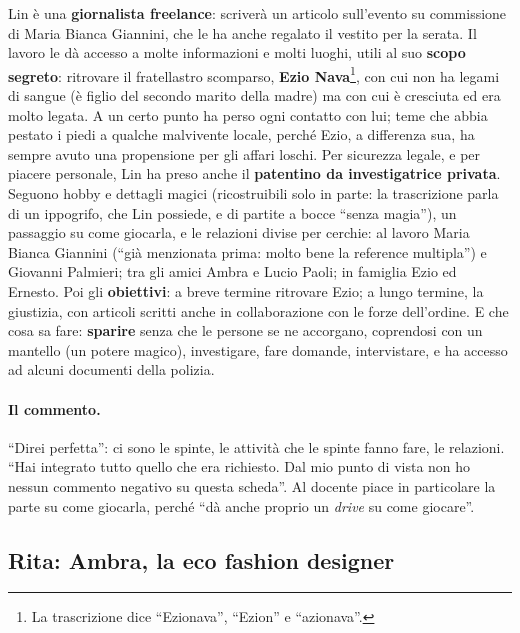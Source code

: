 Lin è una \textbf{giornalista freelance}: scriverà un articolo sull'evento su
commissione di Maria Bianca Giannini, che le ha anche regalato il vestito per la
serata. Il lavoro le dà accesso a molte informazioni e molti luoghi, utili al suo
\textbf{scopo segreto}: ritrovare il fratellastro scomparso, \textbf{Ezio
Nava}\footnote{La trascrizione dice ``Ezionava'', ``Ezion'' e ``azionava''.}, con
cui non ha legami di sangue (è figlio del secondo marito della madre) ma con cui è
cresciuta ed era molto legata. A un certo punto ha perso ogni contatto con lui;
teme che abbia pestato i piedi a qualche malvivente locale, perché Ezio, a
differenza sua, ha sempre avuto una propensione per gli affari loschi. Per
sicurezza legale, e per piacere personale, Lin ha preso anche il
\textbf{patentino da investigatrice privata}. Seguono hobby e dettagli magici
(ricostruibili solo in parte: la trascrizione parla di un ippogrifo, che Lin
possiede, e di partite a bocce ``senza magia''), un passaggio su come giocarla, e
le relazioni divise per cerchie: al lavoro Maria Bianca Giannini (``già menzionata
prima: molto bene la reference multipla'') e Giovanni Palmieri; tra gli amici
Ambra e Lucio Paoli; in famiglia Ezio ed Ernesto. Poi gli \textbf{obiettivi}: a
breve termine ritrovare Ezio; a lungo termine, la giustizia, con articoli scritti
anche in collaborazione con le forze dell'ordine. E che cosa sa fare:
\textbf{sparire} senza che le persone se ne accorgano, coprendosi con un mantello
(un potere magico), investigare, fare domande, intervistare, e ha accesso ad alcuni
documenti della polizia.

\paragraph{Il commento.} ``Direi perfetta'': ci sono le spinte, le attività che
le spinte fanno fare, le relazioni. ``Hai integrato tutto quello che era
richiesto. Dal mio punto di vista non ho nessun commento negativo su questa
scheda''. Al docente piace in particolare la parte su come giocarla, perché ``dà
anche proprio un \emph{drive} su come giocare''.

\subsection{Rita: Ambra, la eco fashion designer}

